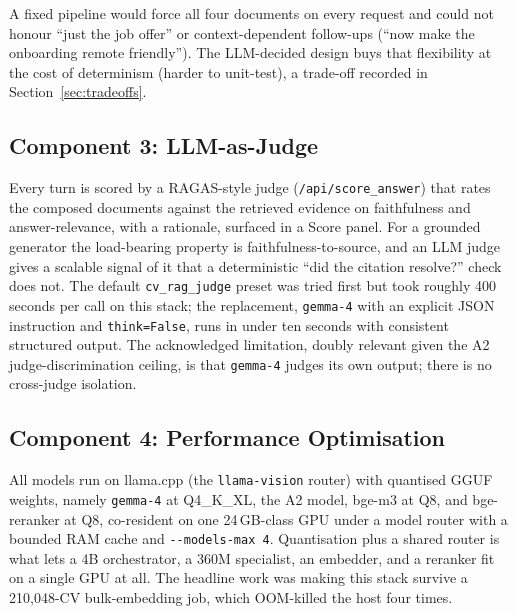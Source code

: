 A fixed pipeline would force all four documents on every request and could not honour
``just the job offer'' or context-dependent follow-ups (``now make the onboarding remote
friendly''). The LLM-decided design buys that flexibility at the cost of determinism
(harder to unit-test), a trade-off recorded in Section~\ref{sec:tradeoffs}.

\subsection{Component 3: LLM-as-Judge}
\label{sec:judge}

Every turn is scored by a RAGAS-style judge (\verb|/api/score_answer|) that rates the
composed documents against the retrieved evidence on faithfulness and answer-relevance,
with a rationale, surfaced in a Score panel. For a grounded generator the load-bearing
property is faithfulness-to-source, and an LLM judge gives a scalable signal of it that a
deterministic ``did the citation resolve?'' check does not. The default \verb|cv_rag_judge|
preset was tried first but took roughly 400 seconds per call on this stack; the
replacement, \verb|gemma-4| with an explicit JSON instruction and \verb|think=False|, runs
in under ten seconds with consistent structured output. The acknowledged limitation,
doubly relevant given the A2 judge-discrimination ceiling, is that \verb|gemma-4| judges
its own output; there is no cross-judge isolation.

\subsection{Component 4: Performance Optimisation}
\label{sec:perf}

All models run on llama.cpp (the \verb|llama-vision| router) with quantised GGUF weights,
namely \verb|gemma-4| at Q4\_K\_XL, the A2 model, bge-m3 at Q8, and bge-reranker at Q8,
co-resident on one 24\,GB-class GPU under a model router with a bounded RAM cache and
\verb|--models-max 4|. Quantisation plus a shared router is what lets a 4B orchestrator, a
360M specialist, an embedder, and a reranker fit on a single GPU at all. The headline work
was making this stack survive a 210,048-CV bulk-embedding job, which OOM-killed the host
four times.

